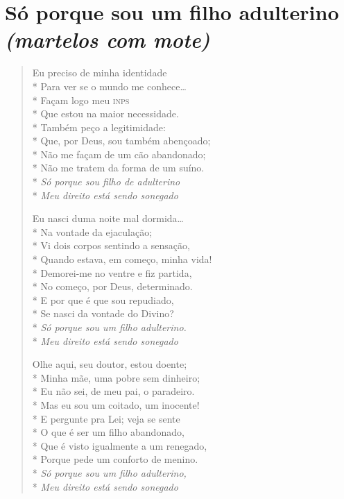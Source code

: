 \chapter[Só porque sou um filho adulterino]{Só porque sou um filho adulterino\\\smallskip\textit{(martelos com mote)}}

\begin{verse}
Eu preciso de minha identidade\\*
Para ver se o mundo me conhece\ldots{}\\*
Façam logo meu \textsc{inps}\\*
Que estou na maior necessidade.\\*
Também peço a legitimidade:\\*
Que, por Deus, sou também abençoado;\\*
Não me façam de um cão abandonado;\\*
Não me tratem da forma de um suíno.\\*
\textit{Só porque sou filho de adulterino}\\*
\textit{Meu direito está sendo sonegado}

Eu nasci duma noite mal dormida\ldots{}\\*
Na vontade da ejaculação;\\*
Vi dois corpos sentindo a sensação,\\*
Quando estava, em começo, minha vida!\\*
Demorei-me no ventre e fiz partida,\\*
No começo, por Deus, determinado.\\*
E por que é que sou repudiado,\\*
Se nasci da vontade do Divino?\\*
\textit{Só porque sou um filho adulterino.}\\*
\textit{Meu direito está sendo sonegado}

Olhe aqui, seu doutor, estou doente;\\*
Minha mãe, uma pobre sem dinheiro;\\*
Eu não sei, de meu pai, o paradeiro.\\*
Mas eu sou um coitado, um inocente!\\*
E pergunte pra Lei; veja se sente\\*
O que é ser um filho abandonado,\\*
Que é visto igualmente a um renegado,\\*
Porque pede um conforto de menino.\\*
\textit{Só porque sou um filho adulterino,}\\*
\textit{Meu direito está sendo sonegado}


\end{verse}
